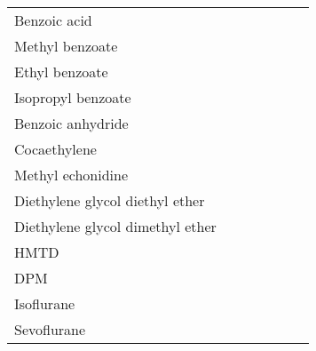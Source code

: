 \begin{landscape}
\begin{longtable}[c]{@{}lcccccc@{}}
Benzoic acid         &                  &                     &                              &                               &                          &                  \\
Methyl benzoate      &                  &                     &                              &                               &                          &                  \\
Ethyl benzoate       &                  &                     &                              &                               &                          &                  \\
Isopropyl benzoate   &                  &                     &                              &                               &                          &                  \\
Benzoic anhydride    &                  &                     &                              &                               &                          &                  \\
Cocaethylene         &                  &                     &                              &                               &                          &                  \\
Methyl echonidine    &                  &                     &                              &                               &                          &                  \\
Diethylene glycol  diethyl ether  &                  &                     &                              &                               &                          &                  \\
Diethylene glycol  dimethyl ether  &                  &                     &                              &                               &                          &                  \\
HMTD                 &                  &                     &                              &                               &                          &                  \\
DPM                  &                  &                     &                              &                               &                          &                  \\
Isoflurane           &                  &                     &                              &                               &                          &                  \\
Sevoflurane          &                  &                     &                              &                               &                          &                  \\

\end{longtable}
\end{landscape}
